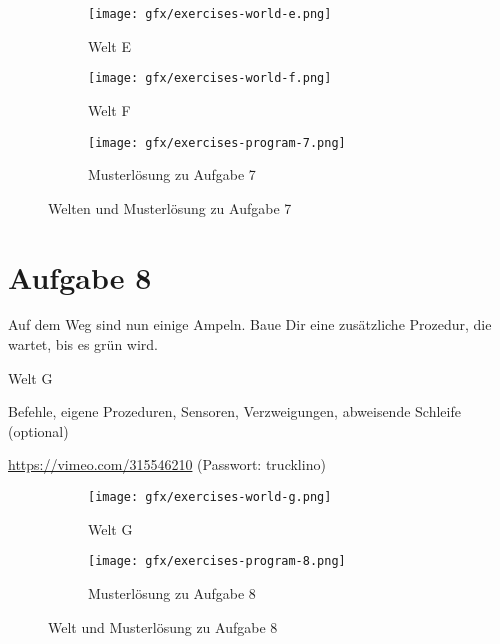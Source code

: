 \begin{figure}[H]
  \begin{subfigure}[b]{0.40\textwidth}
    \texttt{[image: gfx/exercises-world-e.png]}
    \caption{Welt E}
  \end{subfigure}\hfill
  \begin{subfigure}[b]{0.40\textwidth}
    \texttt{[image: gfx/exercises-world-f.png]}
    \caption{Welt F}
  \end{subfigure}\hfill
  \vspace{0.5cm}
  \begin{subfigure}[b]{0.40\textwidth}
    \texttt{[image: gfx/exercises-program-7.png]}
    \caption{Musterlösung zu Aufgabe 7}
  \end{subfigure}\hfill
  \caption{Welten und Musterlösung zu Aufgabe 7}
\end{figure}

\pagebreak

\section{Aufgabe 8}
\label{sec:exercises:8}

Auf dem Weg sind nun einige Ampeln. Baue Dir eine zusätzliche Prozedur, die wartet, bis es grün wird.

\begin{description}[noitemsep]
  \item[Welt wählen:] Welt G
  \item[Du brauchst:] Befehle, eigene Prozeduren, Sensoren, Verzweigungen, abweisende Schleife (optional)
  \item[Video:] \url{https://vimeo.com/315546210} (Passwort: trucklino)
\end{description}

\begin{figure}[H]
  \begin{subfigure}[b]{0.40\textwidth}
    \texttt{[image: gfx/exercises-world-g.png]}
    \caption{Welt G}
  \end{subfigure}\hfill
  \begin{subfigure}[b]{0.40\textwidth}
    \texttt{[image: gfx/exercises-program-8.png]}
    \caption{Musterlösung zu Aufgabe 8}
  \end{subfigure}\hfill
  \caption{Welt und Musterlösung zu Aufgabe 8}
\end{figure}
